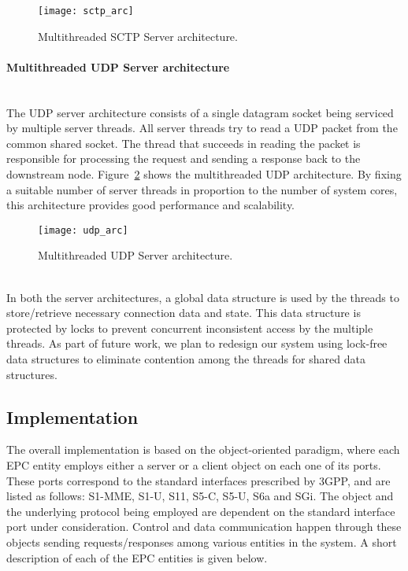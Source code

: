 \documentclass[hidelinks]{report}
\begin{document}
\begin{figure}[h]

\centering
\texttt{[image: sctp\_arc]}
\caption{Multithreaded SCTP Server architecture.}
\label{sctp_arc}

\end{figure}

\paragraph*{Multithreaded UDP Server architecture}

~\\ The UDP server architecture consists of a single datagram socket being serviced by multiple server threads. All server threads try to read a UDP packet from the common shared socket. The thread that succeeds in reading the packet is responsible for processing the request and sending a response back to the downstream node. Figure~\ref{udp_arc} shows the multithreaded UDP architecture. By fixing a suitable number of server threads in proportion to the number of system cores, this architecture provides good performance and scalability. 

\begin{figure}[h]

\centering
\texttt{[image: udp\_arc]}
\caption{Multithreaded UDP Server architecture.}
\label{udp_arc}

\end{figure}

~\\
In both the server architectures, a global data structure is used by the threads to store/retrieve necessary connection data and state. This data structure is protected by locks to prevent concurrent inconsistent access by the multiple threads. As part of future work, we plan to redesign our system using lock-free data structures to eliminate contention among the threads for shared data structures.

\subsection*{Implementation}

The overall implementation is based on the object-oriented paradigm, where each EPC entity employs either a server or a client object on each one of its ports. These ports correspond to the standard interfaces prescribed by 3GPP, and are listed as follows: S1-MME, S1-U, S11, S5-C, S5-U, S6a and SGi. The object and the underlying protocol being employed are dependent on the standard interface port under consideration. Control and data communication happen through these objects sending requests/responses among various entities in the system. A short description of each of the EPC entities is given below.
\end{document}
